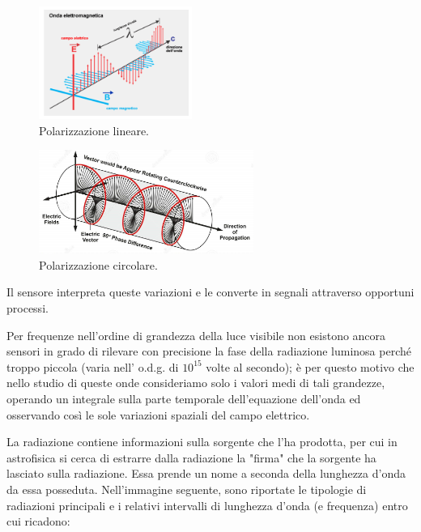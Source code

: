 \begin{minipage}{0.5\textwidth}
    \begin{figure}[H]
        \centering
        \includegraphics[width=5cm]{onda-elettromagnetica.png}
        \caption*{Polarizzazione lineare.}
     \end{figure}
\end{minipage}
\begin{minipage}{0.5\textwidth}
    \vspace{0.3cm}\begin{figure}[H]
        \centering
        \includegraphics[width=7cm]{pol circ.jpg}
        \caption*{Polarizzazione circolare.}
    \end{figure}
\end{minipage}

\vspace{0.3cm}Il sensore interpreta queste variazioni e le converte in segnali attraverso opportuni processi.

Per frequenze nell'ordine di grandezza della luce visibile non esistono ancora sensori in grado di rilevare con precisione la fase della radiazione luminosa perché troppo piccola (varia nell' o.d.g. di $10^{15}$ volte al secondo); è per questo motivo che nello studio di queste onde consideriamo solo i valori medi di tali grandezze, operando un integrale sulla parte temporale dell'equazione dell'onda ed osservando così le sole variazioni spaziali del campo elettrico.

\vspace{0.2cm}La radiazione contiene informazioni sulla sorgente che l'ha prodotta, per cui in astrofisica si cerca di estrarre dalla radiazione la "firma" che la sorgente ha lasciato sulla radiazione. Essa prende un nome a seconda della lunghezza d'onda da essa posseduta. Nell'immagine seguente, sono riportate le tipologie di radiazioni principali e i relativi intervalli di lunghezza d'onda (e frequenza) entro cui ricadono:

